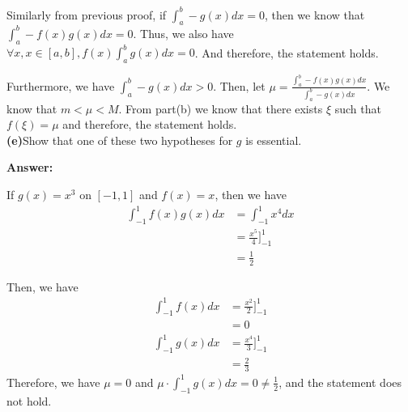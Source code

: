 \documentclass[a4paper,12pt]{report}
\begin{document}
\noindent
Similarly from previous proof, if $\int_a^b-g(x)dx=0$, then we know that $\int_a^b-f(x)g(x)dx=0$. Thus, we also have $\forall x, x\in[a,b], f(x)\int_a^bg(x)dx=0$. And therefore, the statement holds.

\noindent
Furthermore, we have $\int_a^b-g(x)dx>0$. Then, let $\mu = \frac{\int_a^b-f(x)g(x)dx}{\int_a^b-g(x)dx}$. We know that $m< \mu <M$. From part(b) we know that there exists $\xi$ such that $f(\xi)=\mu$ and therefore, the statement holds.\\

\noindent
\textbf{(e)}Show that one of these two hypotheses for $g$ is essential. 

\noindent
\textbf{Answer: }

\noindent
If $g(x)=x^3$ on $[-1,1]$ and $f(x)=x$, then we have 
\begin{align*}
\int_{-1}^1f(x)g(x)dx&=\int_{-1}^1x^4dx\\
&=\frac{x^5}{4}]_{-1}^{1}\\
&=\frac{1}{2}
\end{align*}

\noindent
Then, we have 
\begin{align*}
\int_{-1}^1f(x)dx&=\frac{x^2}{2}]_{-1}^1\\
&=0\\
\int_{-1}^1g(x)dx&=\frac{x^4}{3}]_{-1}^1\\
&=\frac{2}{3}
\end{align*}
Therefore, we have $\mu =0$ and $\mu\cdot \int_{-1}^1g(x)dx=0\neq \frac{1}{2}$, and the statement does not hold. 
\end{document}
